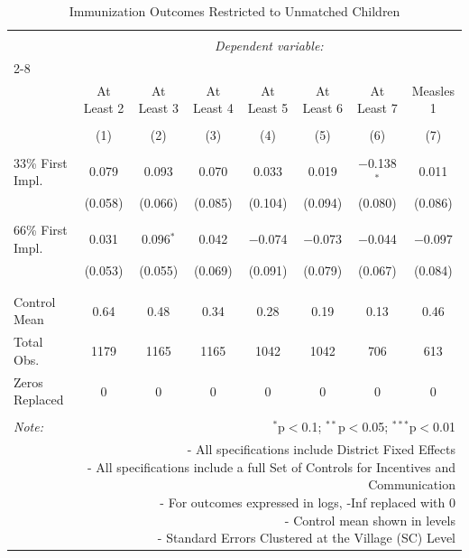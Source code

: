 
\begin{table}[!htbp] \centering 
  \caption{Immunization Outcomes Restricted to Unmatched Children} 
  \label{} 
\scriptsize 
\begin{tabular}{@{\extracolsep{0.25pt}}lccccccc} 
\\[-1.8ex]\hline 
\hline \\[-1.8ex] 
 & \multicolumn{7}{c}{\textit{Dependent variable:}} \\ 
\cline{2-8} 
\\[-1.8ex] & At Least 2 & At Least 3 & At Least 4 & At Least 5 & At Least 6 & At Least 7 & Measles 1 \\ 
\\[-1.8ex] & (1) & (2) & (3) & (4) & (5) & (6) & (7)\\ 
\hline \\[-1.8ex] 
 33\% First Impl. & 0.079 & 0.093 & 0.070 & 0.033 & 0.019 & $-$0.138$^{*}$ & 0.011 \\ 
  & (0.058) & (0.066) & (0.085) & (0.104) & (0.094) & (0.080) & (0.086) \\ 
  & & & & & & & \\ 
 66\% First Impl. & 0.031 & 0.096$^{*}$ & 0.042 & $-$0.074 & $-$0.073 & $-$0.044 & $-$0.097 \\ 
  & (0.053) & (0.055) & (0.069) & (0.091) & (0.079) & (0.067) & (0.084) \\ 
  & & & & & & & \\ 
\hline \\[-1.8ex] 
Control Mean & 0.64 & 0.48 & 0.34 & 0.28 & 0.19 & 0.13 & 0.46 \\ 
Total Obs. & 1179 & 1165 & 1165 & 1042 & 1042 & 706 & 613 \\ 
Zeros Replaced & 0 & 0 & 0 & 0 & 0 & 0 & 0 \\ 
\hline 
\hline \\[-1.8ex] 
\textit{Note:}  & \multicolumn{7}{r}{$^{*}$p$<$0.1; $^{**}$p$<$0.05; $^{***}$p$<$0.01} \\ 
 & \multicolumn{7}{r}{\parbox[t]{\textwidth}{- All specifications include District Fixed Effects \\ - All specifications include a full Set of Controls for Incentives and Communication \\ - For outcomes expressed in logs, -Inf replaced with 0
                                                    \\ - Control mean shown in levels
                                                    \\ - Standard Errors Clustered at the Village (SC) Level }} \\ 
\end{tabular} 
\end{table} 
